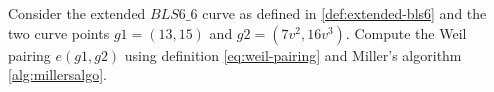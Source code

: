 \begin{exercise}
\label{ex:generator-pairing}
Consider the extended $BLS6\_6$ curve as defined in \ref{def:extended-bls6} and the two curve points $g1=(13,15)$ and $g2=(7v^2,16v^3)$. Compute the Weil pairing 
$e(g1,g2)$ using definition \ref{eq:weil-pairing} and Miller's algorithm \ref{alg:millersalgo}.
\end{exercise}

